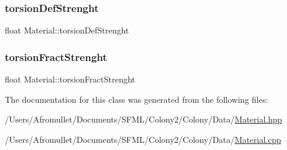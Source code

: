 \mbox{\label{class_material_a87acb6b7a1cd5e88b78ec5a6dbabfef6}} 
\subsubsection{\texorpdfstring{torsion\+Def\+Strenght}{torsionDefStrenght}}
{\footnotesize\ttfamily float Material\+::torsion\+Def\+Strenght\hspace{0.3cm}{\ttfamily [private]}}

\mbox{\label{class_material_a8e21e3e07c1996ce1131d19ddf459622}} 
\subsubsection{\texorpdfstring{torsion\+Fract\+Strenght}{torsionFractStrenght}}
{\footnotesize\ttfamily float Material\+::torsion\+Fract\+Strenght\hspace{0.3cm}{\ttfamily [private]}}



The documentation for this class was generated from the following files\+:\begin{DoxyCompactItemize}
\item 
/\+Users/\+Afromullet/\+Documents/\+S\+F\+M\+L/\+Colony2/\+Colony/\+Data/\mbox{\hyperlink{_material_8hpp}{Material.\+hpp}}\item 
/\+Users/\+Afromullet/\+Documents/\+S\+F\+M\+L/\+Colony2/\+Colony/\+Data/\mbox{\hyperlink{_material_8cpp}{Material.\+cpp}}\end{DoxyCompactItemize}
